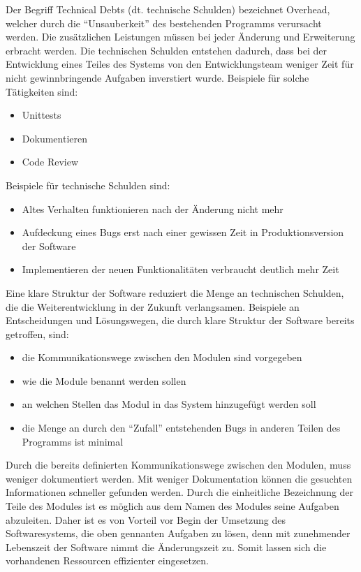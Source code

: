 Der Begriff Technical Debts (dt. technische Schulden) bezeichnet Overhead, 
welcher durch die ``Unsauberkeit'' des bestehenden Programms verursacht werden.
Die zusätzlichen Leistungen müssen bei jeder Änderung und Erweiterung erbracht werden.
Die technischen Schulden entstehen dadurch, dass bei der Entwicklung eines Teiles des Systems
von den Entwicklungsteam weniger Zeit für nicht gewinnbringende Aufgaben inverstiert wurde.
Beispiele für solche Tätigkeiten sind:
\begin{itemize}
    \item Unittests
    \item Dokumentieren 
    \item Code Review
\end{itemize}

Beispiele für technische Schulden sind:
\begin{itemize}
    \item Altes Verhalten funktionieren nach der Änderung nicht mehr
    \item Aufdeckung eines Bugs erst nach einer gewissen Zeit in Produktionsversion der Software
    \item Implementieren der neuen Funktionalitäten verbraucht deutlich mehr Zeit
\end{itemize}

Eine klare Struktur der Software reduziert die Menge an technischen Schulden, 
die die Weiterentwicklung in der Zukunft verlangsamen. 
Beispiele an Entscheidungen und Lösungswegen, 
die durch klare Struktur der Software bereits getroffen, sind:

\begin{itemize}
    \item die Kommunikationswege zwischen den Modulen sind vorgegeben
    \item wie die Module benannt werden sollen
    \item an welchen Stellen das Modul in das System hinzugefügt werden soll
    \item die Menge an durch den ``Zufall'' entstehenden Bugs in anderen Teilen des Programms ist minimal
\end{itemize}

Durch die bereits definierten Kommunikationswege zwischen den Modulen, muss weniger dokumentiert werden.
Mit weniger Dokumentation können die gesuchten Informationen schneller gefunden werden.
Durch die einheitliche Bezeichnung der Teile des Modules ist es möglich aus dem Namen des Modules seine Aufgaben abzuleiten.
Daher ist es von Vorteil vor Begin der Umsetzung des Softwaresystems, die oben gennanten Aufgaben zu lösen,
denn mit zunehmender Lebenszeit der Software nimmt die Änderungszeit zu.
Somit lassen sich die vorhandenen Ressourcen effizienter eingesetzen.